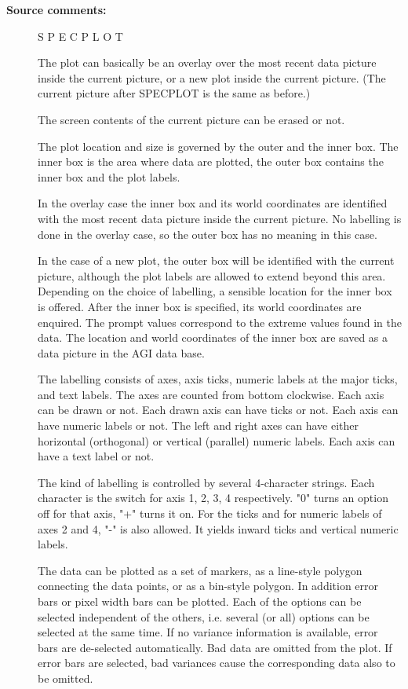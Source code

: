 \begin{description}
\begin{description}
\end{description}

\item [\textbf{Source comments:}]
\begin{terminalv}
   S P E C P L O T

   The plot can basically be an overlay over the most recent data
   picture inside the current picture, or a new plot inside the
   current picture. (The current picture after SPECPLOT is the
   same as before.)

   The screen contents of the current picture can be erased or not.

   The plot location and size is governed by the outer and the
   inner box. The inner box is the area where data are plotted,
   the outer box contains the inner box and the plot labels.

   In the overlay case the inner box and its world coordinates are
   identified with the most recent data picture inside the current
   picture. No labelling is done in the overlay case, so the outer
   box has no meaning in this case.

   In the case of a new plot, the outer box will be identified
   with the current picture, although the plot labels are allowed
   to extend beyond this area. Depending on the choice of
   labelling, a sensible location for the inner box is offered.
   After the inner box is specified, its world coordinates are
   enquired. The prompt values correspond to the extreme values
   found in the data. The location and world coordinates of the inner
   box are saved as a data picture in the AGI data base.

   The labelling consists of axes, axis ticks, numeric labels at
   the major ticks, and text labels. The axes are counted from
   bottom clockwise. Each axis can be drawn or not. Each
   drawn axis can have ticks or not. Each axis can have numeric
   labels or not. The left and right axes can have either
   horizontal (orthogonal) or vertical (parallel) numeric labels.
   Each axis can have a text label or not.

   The kind of labelling is controlled by several 4-character
   strings. Each character is the switch for axis 1, 2, 3, 4
   respectively. "0" turns an option off for that axis, "+" turns
   it on. For the ticks and for numeric labels of axes 2 and 4,
   "-" is also allowed. It yields inward ticks and vertical
   numeric labels.

   The data can be plotted as a set of markers, as a line-style
   polygon connecting the data points, or as a bin-style polygon.
   In addition error bars or pixel width bars can be plotted. Each
   of the options can be selected independent of the others, i.e.
   several (or all) options can be selected at the same time. If
   no variance information is available, error bars are de-selected
   automatically. Bad data are omitted from the plot. If error
   bars are selected, bad variances cause the corresponding data
   also to be omitted.


\end{terminalv}
\end{description}
